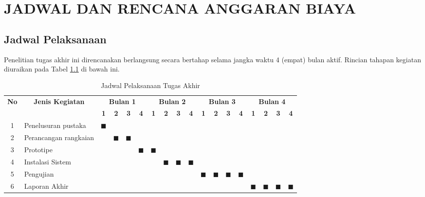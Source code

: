 \chapter{JADWAL DAN RENCANA ANGGARAN BIAYA}
\label{bab:5}

\section{Jadwal Pelaksanaan}
Penelitian tugas akhir ini direncanakan berlangsung secara bertahap selama jangka waktu 4 (empat) bulan aktif. Rincian tahapan kegiatan diuraikan pada Tabel \ref{tab:jadwal} di bawah ini.

\begin{table}[htbp]
\centering
\caption{Jadwal Pelaksanaan Tugas Akhir}
\label{tab:jadwal}
\setlength{\tabcolsep}{3pt} 
\small %
\begin{tabular}{|c|l|c|c|c|c|c|c|c|c|c|c|c|c|c|c|c|c|}
\hline
\multirow{2}{*}{\textbf{No}} & \multicolumn{1}{c|}{\multirow{2}{*}{\textbf{Jenis Kegiatan}}} & \multicolumn{4}{c|}{\textbf{Bulan 1}} & \multicolumn{4}{c|}{\textbf{Bulan 2}} & \multicolumn{4}{c|}{\textbf{Bulan 3}} & \multicolumn{4}{c|}{\textbf{Bulan 4}} \\ \cline{3-18} 
 & \multicolumn{1}{c|}{} & \textbf{1} & \textbf{2} & \textbf{3} & \textbf{4} & \textbf{1} & \textbf{2} & \textbf{3} & \textbf{4} & \textbf{1} & \textbf{2} & \textbf{3} & \textbf{4} & \textbf{1} & \textbf{2} & \textbf{3} & \textbf{4} \\ \hline
1 & Penelusuran pustaka &  $\blacksquare$ & & & & & & & & & & & & & & & \\ \hline
2 & Perancangan rangkaian & & $\blacksquare$ & $\blacksquare$ & & & & & & & & & & & & & \\ \hline
3 & Prototipe & & & & $\blacksquare$ & $\blacksquare$ & & & & & & & & & & & \\ \hline
4 & Instalasi Sistem & & & & & & $\blacksquare$ & $\blacksquare$ & $\blacksquare$ & & & & & & & & \\ \hline
5 & Pengujian & & & & & & & & & $\blacksquare$ & $\blacksquare$ & $\blacksquare$ & $\blacksquare$ & & & & \\ \hline
6 & Laporan Akhir & & & & & & & & & & & & & $\blacksquare$ & $\blacksquare$ & $\blacksquare$ & $\blacksquare$ \\ \hline
\end{tabular}
\end{table}

